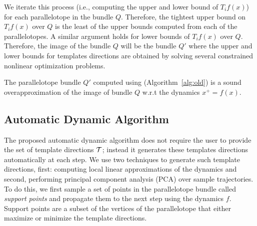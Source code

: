 We iterate this process (i.e., computing the upper and lower bound of $T_{i}f(x)$) for each parallelotope in the bundle $Q$.
%
%
Therefore, the tightest upper bound on $T_{i}f(x)$ over $Q$ is the least of the upper bounds computed from each of the parallelotopes.
%
A similar argument holds for lower bounds of $T_{i}f(x)$ over $Q$.
%
Therefore, the image of the bundle $Q$ will be the bundle $Q'$ where the upper and lower bounds for templates directions are obtained by solving several constrained nonlinear optimization problems.

\begin{lemma}
\label{lem:correctness}
The parallelotope bundle $Q'$ computed using \tbundle (Algorithm~\ref{alg:old}) is a sound overapproximation of the image of bundle $Q$ w.r.t the dynamics $x^{+} = f(x)$.
\end{lemma}




\vspace{-1.5em}
\subsection{Automatic Dynamic Algorithm}

The proposed automatic dynamic algorithm does not require the user to provide the set of template directions ${\cal T}$; instead it generates these templates directions automatically at each step.
%
We use two techniques to generate such template directions, first: computing local linear approximations of the dynamics and second, performing principal component analysis (PCA) over sample trajectories.
%
To do this, we first sample a set of points in the parallelotope bundle called \emph{support points} and propagate them to the next step using the dynamics $f$.
%
Support points are a subset of the vertices of the parallelotope that either maximize or minimize the template directions.

